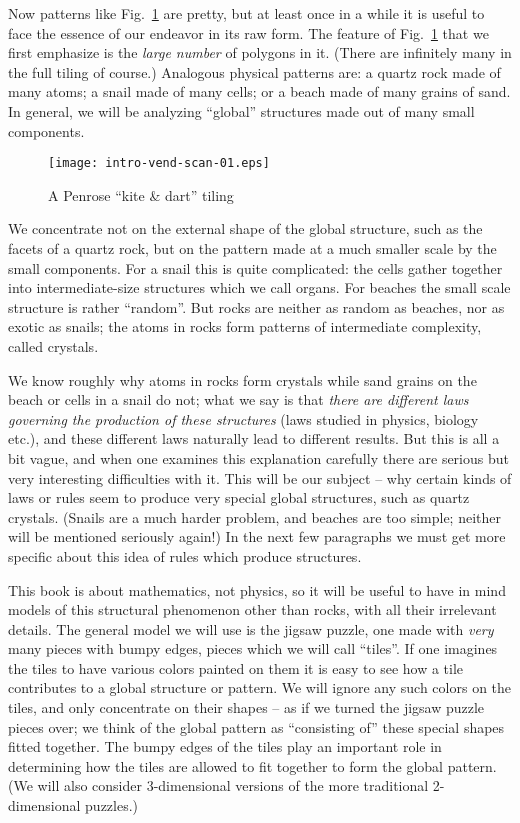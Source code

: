 \documentclass[reqno]{stml-l}
\theoremstyle{plain}
\theoremstyle{definition}
\numberwithin{equation}{chapter}
\begin{document}
Now patterns like Fig.~\ref{Intro:fig1} are pretty, but at
least once in a while it is useful to face the essence of
our endeavor in its raw form. The feature of
Fig.~\ref{Intro:fig1} that we first emphasize is the
\emph{large number} of polygons in it. (There are
infinitely many in the full tiling of course.) Analogous
physical patterns are: a quartz rock made of many atoms; a
snail made of many cells; or a beach made of many grains of
sand. In general, we will be analyzing ``global''
structures made out of many small components.

\begin{figure}[h]
\texttt{[image: intro-vend-scan-01.eps]}
\caption{A Penrose ``kite \& dart'' tiling}
\label{Intro:fig1}
\end{figure}


We concentrate not on the external shape of the global
structure, such as the facets of a quartz rock, but on the
pattern made at a much smaller scale by the small
components. For a snail this is quite complicated: the
cells gather together into intermediate-size structures
which we call organs. For beaches the small scale structure
is rather ``random''. But rocks are neither as random as
beaches, nor as exotic as snails; the atoms in rocks form
patterns of intermediate complexity, called crystals.

We know roughly why atoms in rocks form crystals while sand
grains on the beach or cells in a snail do not; what we say
is that \emph{there are different laws governing the
production of these structures} (laws studied in physics,
biology etc.), and these different laws naturally lead to
different results. But this is all a bit vague, and when
one examines this explanation carefully there are serious
but very interesting difficulties with it. This will be our
subject -- why certain kinds of laws or rules seem to
produce very special global structures, such as quartz
crystals. (Snails are a much harder problem, and beaches
are too simple; neither will be mentioned seriously again!)
In the next few paragraphs we must get more specific about
this idea of rules which produce structures.

This book is about mathematics, not physics, so it will be
useful to have in mind models of this structural phenomenon
other than rocks, with all their irrelevant details. The
general model we will use is the jigsaw puzzle, one made
with \emph{very} many pieces with bumpy edges, pieces which
we will call ``tiles''. If one imagines the tiles to have
various colors painted on them it is easy to see how a tile
contributes to a global structure or pattern. We will
ignore any such colors on the tiles, and only concentrate
on their shapes -- as if we turned the jigsaw puzzle pieces
over; we think of the global pattern as ``consisting of''
these special shapes fitted together. The bumpy edges of
the tiles play an important role in determining how the
tiles are allowed to fit together to form the global
pattern. (We will also consider 3-dimensional versions of
the more traditional 2-dimensional puzzles.)
\end{document}
